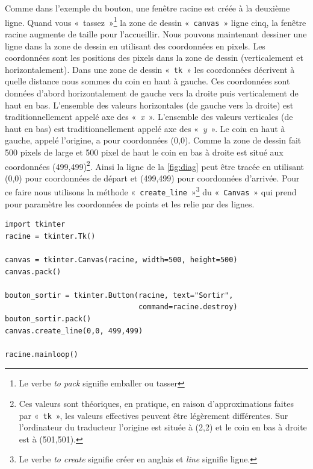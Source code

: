 Comme dans l'exemple du bouton, une fenêtre racine est créée à la deuxième ligne. Quand vous «~tassez~»\footnote{Le verbe \emph{to pack} signifie emballer ou tasser} la zone de dessin «~\texttt{canvas}~» ligne cinq, la fenêtre racine augmente de taille pour l'accueillir. Nous pouvons maintenant dessiner une ligne dans la zone de dessin en utilisant des coordonnées en pixels. Les coordonnées sont les positions des pixels dans la zone de dessin (verticalement et horizontalement). Dans une zone de dessin «~\texttt{tk}~»  les coordonnées décrivent à quelle distance nous sommes du coin en haut à gauche. Ces coordonnées sont données d'abord horizontalement de gauche vers la droite puis verticalement de haut en bas. L'ensemble des valeurs horizontales (de gauche vers la droite) est traditionnellement appelé axe des «~\emph{x}~». L'ensemble des valeurs verticales (de haut en bas) est traditionnellement appelé axe des «~\emph{y}~». Le coin en haut à gauche, appelé l'origine, a pour coordonnées (0,0). Comme la zone de dessin fait 500 pixels de large et 500 pixel de haut le coin en bas à droite est situé aux coordonnées (499,499)\footnote{Ces valeurs sont théoriques, en pratique, en raison d'approximations faites par «~\texttt{tk}~», les valeurs effectives peuvent être légèrement différentes. Sur l'ordinateur du traducteur l'origine est située à (2,2) et le coin en bas à droite est à (501,501).}. Ainsi la ligne de la \autoref{fig:diag} peut être tracée en utilisant (0,0) pour coordonnées de départ et (499,499) pour coordonnées d'arrivée. Pour ce faire nous utilisons la méthode «~\texttt{create\_line}~»\footnote{Le verbe \emph{to create} signifie créer en anglais et \emph{line} signifie ligne.} du «~\texttt{Canvas}~» qui prend pour paramètre les coordonnées de points et les relie par des lignes. 
\begin{Verbatim}[frame=single,rulecolor=\color{mbleu}, label=à taper]
import tkinter
racine = tkinter.Tk()

canvas = tkinter.Canvas(racine, width=500, height=500)
canvas.pack()

bouton_sortir = tkinter.Button(racine, text="Sortir",
                               command=racine.destroy)
bouton_sortir.pack()
canvas.create_line(0,0, 499,499)

racine.mainloop()
\end{Verbatim}

